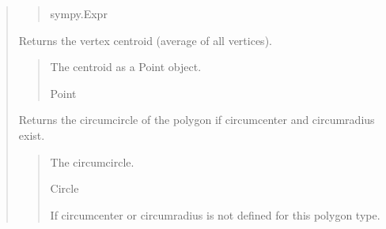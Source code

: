 \documentclass[letterpaper,10pt,english]{sphinxmanual}
\begin{document}
\begin{quote}
\begin{fulllineitems}
\begin{fulllineitems}
\begin{quote}
\begin{description}
\sphinxAtStartPar
sympy.Expr

\end{description}\end{quote}

\end{fulllineitems}


\begin{fulllineitems}
\label{\detokenize{pygeox:pygeox.custom_objects.Polygon.centroid}}
\pysigstartsignatures
\pysigline
{}
\pysigstopsignatures
\sphinxAtStartPar
Returns the vertex centroid (average of all vertices).
\begin{quote}\begin{description}
\sphinxAtStartPar
The centroid as a Point object.

\sphinxAtStartPar
Point

\end{description}\end{quote}

\end{fulllineitems}


\begin{fulllineitems}
\label{\detokenize{pygeox:pygeox.custom_objects.Polygon.circumcircle}}
\pysigstartsignatures
\pysigline
{}
\pysigstopsignatures
\sphinxAtStartPar
Returns the circumcircle of the polygon if circumcenter and circumradius exist.
\begin{quote}\begin{description}
\sphinxAtStartPar
The circumcircle.

\sphinxAtStartPar
Circle

\sphinxAtStartPar
{} \textendash{} If circumcenter or circumradius is not defined for this polygon type.

\end{description}\end{quote}


\end{fulllineitems}
\end{fulllineitems}
\end{quote}
\end{document}
